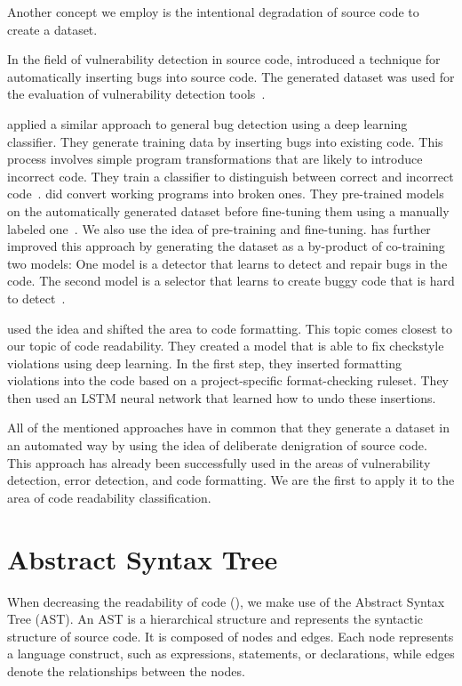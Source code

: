 \documentclass[%
class=scrreprt,
chapterprefix=false,%
open=right,%
twoside=true,%
paper=a4,%
logofile={Logo\_zentral\_farbig\_EN.png},%
thesistype=master,%
UKenglish,%
]{se2thesis}
\theoremstyle{definition}
\newcommand{\rdh}{REDEC\xspace}
\begin{document}
	Another concept we employ is the intentional degradation of source code to create a dataset. 
	
	In the field of vulnerability detection in source code, \citeauthor{dolan2016lava} introduced a technique for automatically inserting bugs into source code. The generated dataset was used for the evaluation of vulnerability detection tools~\cite{dolan2016lava}. 

	\citeauthor{pradel2018deepbugs} applied a similar approach to general bug detection using a deep learning classifier. They generate training data by inserting bugs into existing code. This process involves simple program transformations that are likely to introduce incorrect code. They train a classifier to distinguish between correct and incorrect code~\cite{pradel2018deepbugs}.
	\citeauthor{yasunaga2020graph} did convert working programs into broken ones. They pre-trained models on the automatically generated dataset before fine-tuning them using a manually labeled one~\cite{yasunaga2020graph}. We also use the idea of pre-training and fine-tuning. 
	\citeauthor{allamanis2021self} has further improved this approach by generating the dataset as a by-product of co-training two models: One model is a detector that learns to detect and repair bugs in the code. The second model is a selector that learns to create buggy code that is hard to detect~\cite{allamanis2021self}.
		
	\citeauthor{loriot2022styler} used the idea and shifted the area to code formatting. This topic comes closest to our topic of code readability. They created a model that is able to fix checkstyle violations using deep learning.
	In the first step, they inserted formatting violations into the code based on a project-specific format-checking ruleset.
	They then used an LSTM neural network that learned how to undo these insertions. 
	
	All of the mentioned approaches have in common that they generate a dataset in an automated way by using the idea of deliberate denigration of source code. This approach has already been successfully used in the areas of vulnerability detection, error detection, and code formatting. We are the first to apply it to the area of code readability classification.
	
\section{Abstract Syntax Tree} \label{Abstract Syntax Tree}
	When decreasing the readability of code (), we make use of the Abstract Syntax Tree (AST).
	An AST is a hierarchical structure and represents the syntactic structure of source code. It is composed of nodes and edges. Each node represents a language construct, such as expressions, statements, or declarations, while edges denote the relationships between the nodes.
		
\end{document}
